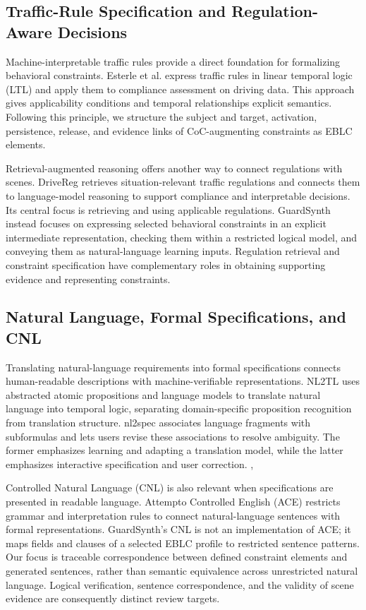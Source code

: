 \documentclass[nolineno]{ieeeaccess}
\begin{document}
\subsection{Traffic-Rule Specification and Regulation-Aware Decisions}

Machine-interpretable traffic rules provide a direct foundation for formalizing behavioral constraints. Esterle et al. express traffic rules in linear temporal logic (LTL) and apply them to compliance assessment on driving data. This approach gives applicability conditions and temporal relationships explicit semantics. Following this principle, we structure the subject and target, activation, persistence, release, and evidence links of CoC-augmenting constraints as EBLC elements. \cite{r6}\par

Retrieval-augmented reasoning offers another way to connect regulations with scenes. DriveReg retrieves situation-relevant traffic regulations and connects them to language-model reasoning to support compliance and interpretable decisions. Its central focus is retrieving and using applicable regulations. GuardSynth instead focuses on expressing selected behavioral constraints in an explicit intermediate representation, checking them within a restricted logical model, and conveying them as natural-language learning inputs. Regulation retrieval and constraint specification have complementary roles in obtaining supporting evidence and representing constraints. \cite{r7}\par

\subsection{Natural Language, Formal Specifications, and CNL}

Translating natural-language requirements into formal specifications connects human-readable descriptions with machine-verifiable representations. NL2TL uses abstracted atomic propositions and language models to translate natural language into temporal logic, separating domain-specific proposition recognition from translation structure. nl2spec associates language fragments with subformulas and lets users revise these associations to resolve ambiguity. The former emphasizes learning and adapting a translation model, while the latter emphasizes interactive specification and user correction. \cite{r8}, \cite{r9}\par

Controlled Natural Language (CNL) is also relevant when specifications are presented in readable language. Attempto Controlled English (ACE) restricts grammar and interpretation rules to connect natural-language sentences with formal representations. GuardSynth's CNL is not an implementation of ACE; it maps fields and clauses of a selected EBLC profile to restricted sentence patterns. Our focus is traceable correspondence between defined constraint elements and generated sentences, rather than semantic equivalence across unrestricted natural language. Logical verification, sentence correspondence, and the validity of scene evidence are consequently distinct review targets. \cite{r10}\par
\end{document}
